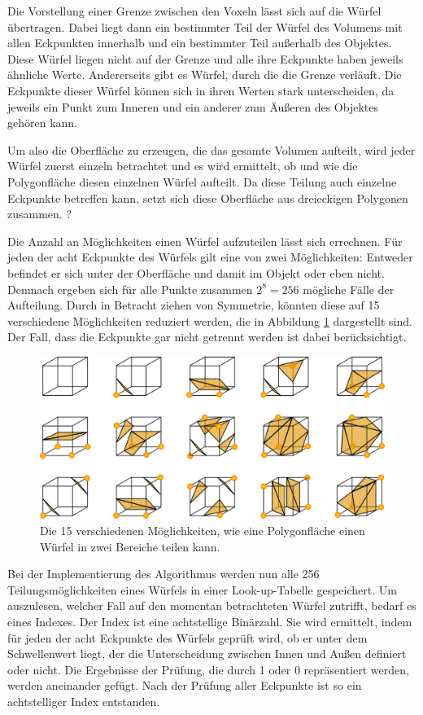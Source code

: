 Die Vorstellung einer Grenze zwischen den Voxeln lässt sich auf die Würfel übertragen. Dabei liegt dann ein bestimmter Teil der Würfel des Volumens mit allen Eckpunkten innerhalb und ein bestimmter Teil außerhalb des Objektes. Diese Würfel liegen nicht auf der Grenze und alle ihre Eckpunkte haben jeweils ähnliche Werte. Andererseits gibt es Würfel, durch die die Grenze verläuft. Die Eckpunkte dieser Würfel können sich in ihren Werten stark unterscheiden, da jeweils ein Punkt zum Inneren und ein anderer zum Äußeren des Objektes gehören kann. 

Um also die Oberfläche zu erzeugen, die das gesamte Volumen aufteilt, wird jeder Würfel zuerst einzeln betrachtet und es wird ermittelt, ob und wie die Polygonfläche diesen einzelnen Würfel aufteilt.  Da diese Teilung auch einzelne Eckpunkte betreffen kann, setzt sich diese Oberfläche aus dreieckigen Polygonen zusammen. ?

Die Anzahl an Möglichkeiten einen Würfel aufzuteilen lässt sich errechnen. Für jeden der acht Eckpunkte des Würfels gilt eine von zwei Möglichkeiten: Entweder befindet er sich unter der Oberfläche und damit im Objekt oder eben nicht. Demnach ergeben sich für alle Punkte zusammen $2^8=256$ mögliche Fälle der Aufteilung. Durch in Betracht ziehen von Symmetrie, könnten diese auf 15 verschiedene Möglichkeiten reduziert werden, die in Abbildung \ref{img:marchingCubes} dargestellt sind. Der Fall, dass die Eckpunkte gar nicht getrennt werden ist dabei berücksichtigt. 

\begin{figure}
	\centering
	\includegraphics[width=0.7\linewidth]{images/MarchingCubes.png}
	\caption{Die 15 verschiedenen Möglichkeiten, wie eine Polygonfläche einen Würfel in zwei Bereiche teilen kann.}
	\label{img:marchingCubes}
\end{figure}

Bei der Implementierung des Algorithmus werden nun alle 256 Teilungsmöglichkeiten eines Würfels in einer Look-up-Tabelle gespeichert. Um auszulesen, welcher Fall auf den momentan betrachteten Würfel zutrifft, bedarf es eines Indexes. 
Der Index ist eine achtstellige Binärzahl. Sie wird ermittelt, indem für jeden der acht Eckpunkte des Würfels geprüft wird, ob er unter dem Schwellenwert liegt, der die Unterscheidung zwischen Innen und Außen definiert oder nicht. Die Ergebnisse der Prüfung, die durch 1 oder 0 repräsentiert werden, werden aneinander gefügt. Nach der Prüfung aller Eckpunkte ist so ein achtstelliger Index entstanden. 

